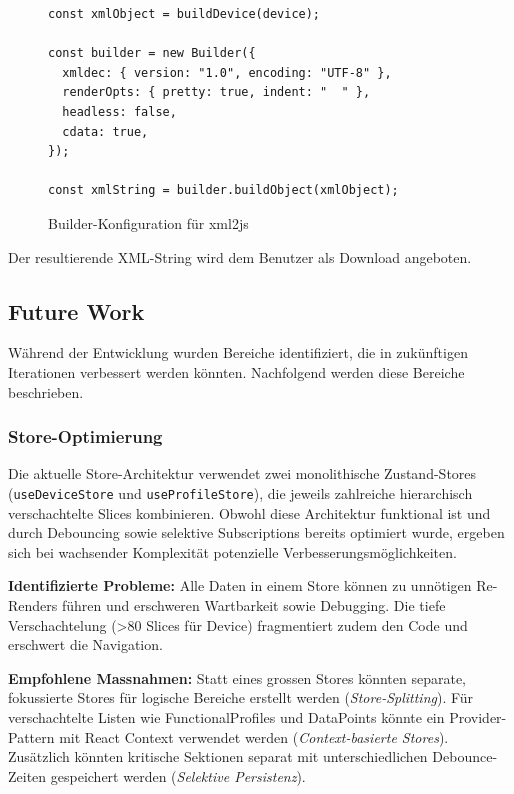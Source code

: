 \documentclass[a4paper,12pt]{article}
\newcommand{\code}[1]{\texttt{#1}}
\begin{document}
\begin{figure}[H]
    \centering
    \begin{lstlisting}[language=typescriptselective,frame=single,backgroundcolor=\color{gray!10},basicstyle=\ttfamily\scriptsize,breaklines=true]
const xmlObject = buildDevice(device);

const builder = new Builder({
  xmldec: { version: "1.0", encoding: "UTF-8" },
  renderOpts: { pretty: true, indent: "  " },
  headless: false,
  cdata: true,
});

const xmlString = builder.buildObject(xmlObject);
    \end{lstlisting}
    \caption{Builder-Konfiguration für xml2js}
    \label{fig:xml2js-builder}
\end{figure}

\noindent Der resultierende XML-String wird dem Benutzer als Download angeboten.

\newpage

\subsection{Future Work}
\label{sec:future-work}

Während der Entwicklung wurden Bereiche identifiziert, die in zukünftigen Iterationen 
verbessert werden könnten. Nachfolgend werden diese Bereiche beschrieben.

\subsubsection{Store-Optimierung}

Die aktuelle Store-Architektur verwendet zwei monolithische Zustand-Stores (\code{useDeviceStore} und 
\code{useProfileStore}), die jeweils zahlreiche hierarchisch verschachtelte Slices kombinieren. 
Obwohl diese Architektur funktional ist und durch Debouncing sowie selektive Subscriptions bereits 
optimiert wurde, ergeben sich bei wachsender Komplexität potenzielle Verbesserungsmöglichkeiten. \newline

\noindent\textbf{Identifizierte Probleme:} Alle Daten in einem Store können zu unnötigen Re-Renders 
führen und erschweren Wartbarkeit sowie Debugging. Die tiefe Verschachtelung (>80 Slices für Device) 
fragmentiert zudem den Code und erschwert die Navigation. \newline

\noindent\textbf{Empfohlene Massnahmen:} Statt eines grossen Stores könnten separate, fokussierte 
Stores für logische Bereiche erstellt werden (\textit{Store-Splitting}). Für verschachtelte Listen 
wie FunctionalProfiles und DataPoints könnte ein Provider-Pattern mit React Context verwendet werden 
(\textit{Context-basierte Stores}). Zusätzlich könnten kritische Sektionen separat mit 
unterschiedlichen Debounce-Zeiten gespeichert werden (\textit{Selektive Persistenz}). \newline
\end{document}
